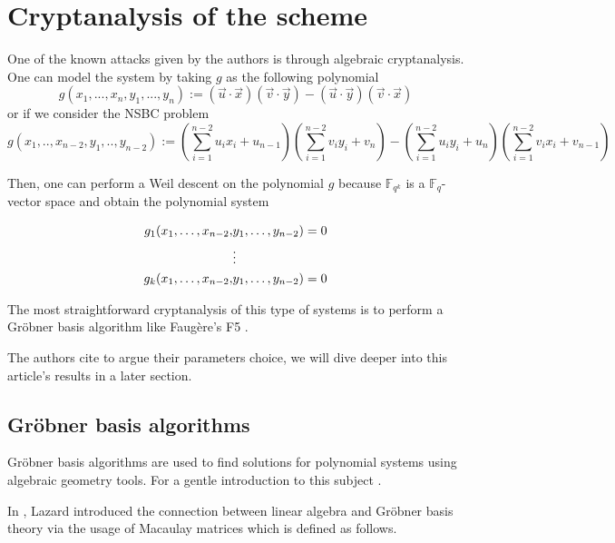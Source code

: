\documentclass[english]{article}
\begin{document}
		\section{Cryptanalysis of the scheme}
		One of the known attacks given by the authors is through algebraic cryptanalysis.
		One can model the system by taking $g$ as the following polynomial
		$$
		g(x_1,...,x_n,y_1,...,y_n) := (\vec{u} \cdot \vec{x})(\vec{v} \cdot \vec{y}) - (\vec{u} \cdot \vec{y})(\vec{v} \cdot \vec{x})
		$$
		or if we consider the NSBC problem
		$$
		g(x_1,..,x_{n-2},y_1,..,y_{n-2}) := (\sum_{i = 1}^{n-2}u_{i}x_{i} + u_{n-1})(\sum_{i = 1}^{n-2}v_{i}y_{i} + v_{n}) - (\sum_{i = 1}^{n-2}u_{i}y_{i} + u_{n})(\sum_{i = 1}^{n-2}v_{i}x_{i} + v_{n-1})
		$$
		
		Then, one can perform a Weil descent on the polynomial $g$ because $\mathbb{F}_{q^k}$ is a $\mathbb{F}_q$-vector space and obtain the polynomial system
		

		\begin{align}
			g_1(x_1, \dots, x_{n-2},& y_1, \dots, y_{n-2}) = 0 \notag \\
			&\vdots \notag \\
			g_k(x_1, \dots, x_{n-2},& y_1, \dots, y_{n-2}) = 0 \notag
		\end{align}
		
		The most straightforward cryptanalysis of this type of systems is to perform a Gröbner basis algorithm like Faugère's F5 \cite{F02}.
		
		The authors cite \cite{FSS11} to argue their parameters choice, we will dive deeper into this article's results in a later section.

		\subsection{Gröbner basis algorithms}
		Gröbner basis algorithms are used to find solutions for polynomial systems using algebraic geometry tools. For a gentle introduction to this subject \cite{CLS}.
		
		In \cite{Lazard83}, Lazard introduced the connection between linear algebra and Gröbner basis theory via the usage of Macaulay matrices \cite{Mac} which is defined as follows.
		
\end{document}

